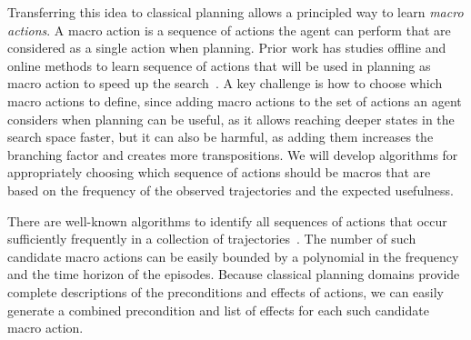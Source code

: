 \documentclass[12pt]{article}
\newcommand{\note}[1]{\textbf{\textit{#1}}}
\begin{document}
Transferring this idea to classical planning allows a principled way to learn {\em macro actions}. A macro action is a sequence of actions the agent can perform that are considered as a single action when planning. Prior work has studies offline and online methods to learn sequence of actions that will be used in planning as macro action to speed up the search~\cite{chrpa2014mum,coles2007marvin,chrpa2015online,koedinger1990abstract,korf1985macro}. A key challenge is how to choose which macro actions to define, since adding macro actions to the set of actions an agent considers when planning can be useful, as it allows reaching deeper states in the search space faster, but it can also be harmful, as adding them increases the branching factor and creates more transpositions. We will develop algorithms for appropriately choosing which sequence of actions should be macros that are based on the frequency of the observed trajectories and the expected usefulness.  





There are well-known algorithms to identify all sequences of actions that occur sufficiently frequently in a collection of trajectories~\cite{mannila1997sequences}. The number of such candidate macro actions can be easily bounded by a polynomial in the frequency and the time horizon of the episodes. Because classical planning domains provide complete descriptions of the preconditions and effects of actions, we can easily generate a combined precondition and list of effects for each such candidate macro action.
\end{document}
